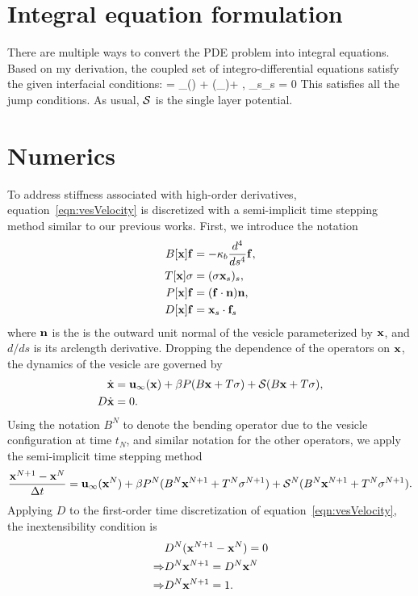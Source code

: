 \documentclass[aps,prl,showpacs]{revtex4}
\begin{document}
\section{Integral equation formulation}
There are multiple ways to convert the PDE problem into integral
equations. Based on my derivation, the coupled set of
integro-differential equations satisfy the given interfacial conditions:
\beq 
  \dot{\mbx} = \mbu_\infty(\mbx) + \beta (\mbf_\cdot\mbn)\mbn + , 
  \label{eqn:vesVelocity}
\eeq
\beq 
  \mbx_s\cdot\dot{\mbx}_s = 0 
\eeq
This satisfies all the jump conditions. As usual, $\mathcal{S}$ is the single layer potential. 

\section{Numerics}
To address stiffness associated with high-order derivatives,
equation~\eqref{eqn:vesVelocity} is discretized with a semi-implicit
time stepping method similar to our previous works.  First, we introduce
the notation
\begin{align}
  B[\mathbf{x}]\mathbf{f} &= -\kappa_b\frac{d^4}{ds^4} \mathbf{f}, \\
  T[\mathbf{x}]\sigma &= (\sigma \mathbf{x}_s)_s, \\
  P[\mathbf{x}]\mathbf{f} &= (\mathbf{f} \cdot \mathbf{n}) \mathbf{n}, \\
  D[\mathbf{x}]\mathbf{f} &= \mathbf{x}_s \cdot \mathbf{f}_s
\end{align}
where $\mathbf{n}$ is the is the outward unit normal of the vesicle
parameterized by $\mathbf{x}$, and $d/ds$ is its arclength derivative.
Dropping the dependence of the operators on $\mathbf{x}$, the dynamics of the
vesicle are governed by
\begin{align}
  \dot{\mathbf{x}} &= \mathbf{u}_{\infty}(\mathbf{x}) + 
  \beta P(B\mathbf{x} + T\sigma) + \mathcal{S}(B\mathbf{x} + T\sigma), \\
  D \dot{\mathbf{x}} &= 0.
\end{align}
Using the notation $B^N$ to denote the bending operator due to the
vesicle configuration at time $t_N$, and similar notation for the other
operators, we apply the semi-implicit time stepping method
\begin{align}  
  \frac{\mathbf{x}^{N+1} - \mathbf{x}^N}{\Delta t} = \mathbf{u}_\infty(\mathbf{x}^N) 
  + \beta P^N(B^N\mathbf{x}^{N+1} + T^N\sigma^{N+1}) 
  + \mathcal{S}^N(B^N\mathbf{x}^{N+1} + T^N\sigma^{N+1}).
\end{align}
Applying $D$ to the first-order time discretization of
equation~\eqref{eqn:vesVelocity}, the inextensibility condition is
\begin{align*}
  &D^N(\mathbf{x}^{N+1} - \mathbf{x}^N) = 0 \\ 
  \Rightarrow &D^N\mathbf{x}^{N+1} = D^N \mathbf{x}^N \\ 
  \Rightarrow &D^N\mathbf{x}^{N+1} = 1.
\end{align*}
\end{document}
